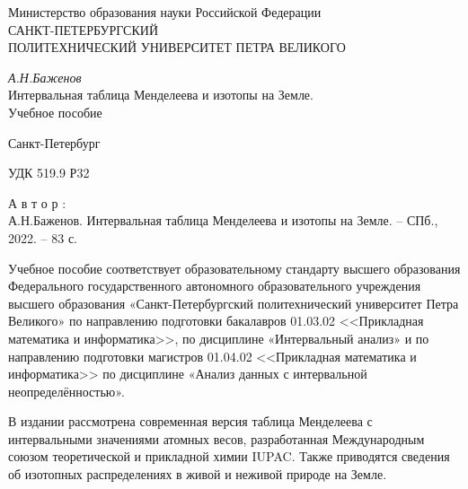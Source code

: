 \documentclass[a5paper,openany]{book}
\begin{document}
	

\begin{center}
	\hfill \break
	\Large{Министерство образования науки Российской Федерации}\\
	\hfill \break
	\Large{	САНКТ-ПЕТЕРБУРГСКИЙ \\
		ПОЛИТЕХНИЧЕСКИЙ УНИВЕРСИТЕТ ПЕТРА ВЕЛИКОГО}\\ 
	\hfill \break
	\hfill \break
	
	
	
	
	
	\Large{\it А.Н.Баженов\\
		\hfill \break		\hfill \break}
	{\huge 	Интервальная таблица Менделеева и изотопы на Земле.}\\
	\hfill \break \hfill \break
	\Large{	Учебное пособие	
	}\\
	\hfill \break \hfill \break
\end{center}

\hfill \break
\begin{center}\Large{Санкт-Петербург \\
		\hfill {}} \end{center}
\thispagestyle{empty} %

\newpage
УДК 519.9
Р32

А в т о р :\\
А.Н.Баженов.
Интервальная таблица Менделеева и изотопы на Земле. – СПб., 2022. – 83 с.
\hfill \break

Учебное пособие соответствует образовательному стандарту высшего
образования Федерального государственного автономного образовательного учреждения высшего образования «Санкт-Петербургский политехнический университет Петра Великого» по направлению подготовки бакалавров 01.03.02 <<Прикладная математика и информатика>>, по дисциплине «Интервальный анализ» и по направлению подготовки  магистров 01.04.02 <<Прикладная математика и информатика>> по дисциплине «Анализ данных с интервальной неопределённостью».


В издании рассмотрена современная версия таблица Менделеева с интервальными значениями атомных весов, разработанная Международным союзом теоретической 
и прикладной химии IUPAC. Также приводятся сведения об изотопных распределениях в живой и неживой природе на Земле.
\end{document}
